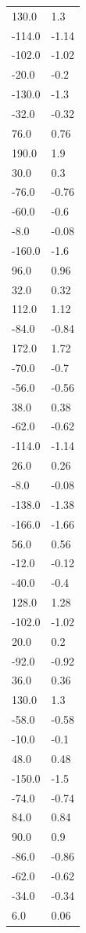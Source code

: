 \begin{longtable}{ll}
130.0 & 1.3 \\
-114.0 & -1.14 \\
-102.0 & -1.02 \\
-20.0 & -0.2 \\
-130.0 & -1.3 \\
-32.0 & -0.32 \\
76.0 & 0.76 \\
190.0 & 1.9 \\
30.0 & 0.3 \\
-76.0 & -0.76 \\
-60.0 & -0.6 \\
-8.0 & -0.08 \\
-160.0 & -1.6 \\
96.0 & 0.96 \\
32.0 & 0.32 \\
112.0 & 1.12 \\
-84.0 & -0.84 \\
172.0 & 1.72 \\
-70.0 & -0.7 \\
-56.0 & -0.56 \\
38.0 & 0.38 \\
-62.0 & -0.62 \\
-114.0 & -1.14 \\
26.0 & 0.26 \\
-8.0 & -0.08 \\
-138.0 & -1.38 \\
-166.0 & -1.66 \\
56.0 & 0.56 \\
-12.0 & -0.12 \\
-40.0 & -0.4 \\
128.0 & 1.28 \\
-102.0 & -1.02 \\
20.0 & 0.2 \\
-92.0 & -0.92 \\
36.0 & 0.36 \\
130.0 & 1.3 \\
-58.0 & -0.58 \\
-10.0 & -0.1 \\
48.0 & 0.48 \\
-150.0 & -1.5 \\
-74.0 & -0.74 \\
84.0 & 0.84 \\
90.0 & 0.9 \\
-86.0 & -0.86 \\
-62.0 & -0.62 \\
-34.0 & -0.34 \\
6.0 & 0.06 \\

\end{longtable}
